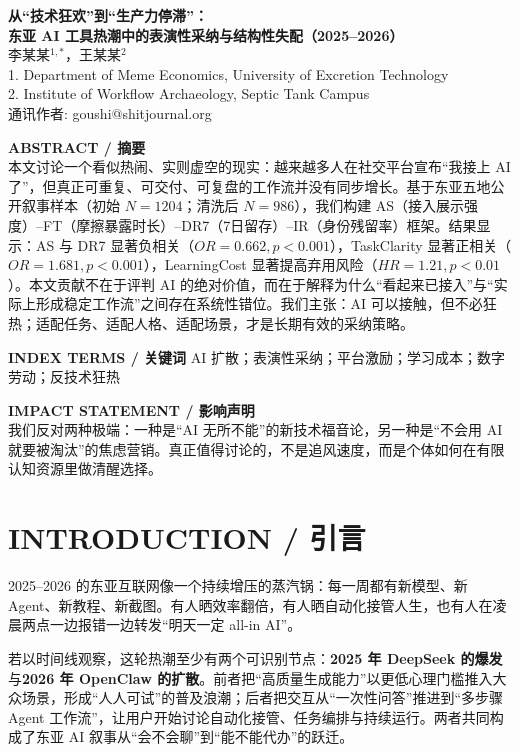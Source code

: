 \documentclass[11pt,a4paper]{ctexart}
\begin{document}
\begin{center}
{\Large\bfseries\color{purple} 从“技术狂欢”到“生产力停滞”：\\
东亚 AI 工具热潮中的表演性采纳与结构性失配（2025--2026）}\\[0.5em]
李某某$^{1,*}$，王某某$^2$\\
\small 1. Department of Meme Economics, University of Excretion Technology\\
\small 2. Institute of Workflow Archaeology, Septic Tank Campus\\
\small *通讯作者: goushi@shitjournal.org
\end{center}

\vspace{0.4em}
\noindent\textbf{ABSTRACT / 摘要}\\
本文讨论一个看似热闹、实则虚空的现实：越来越多人在社交平台宣布“我接上 AI 了”，但真正可重复、可交付、可复盘的工作流并没有同步增长。基于东亚五地公开叙事样本（初始 $N=1204$；清洗后 $N=986$），我们构建 AS（接入展示强度）--FT（摩擦暴露时长）--DR7（7日留存）--IR（身份残留率）框架。结果显示：AS 与 DR7 显著负相关（$OR=0.662, p<0.001$），TaskClarity 显著正相关（$OR=1.681, p<0.001$），LearningCost 显著提高弃用风险（$HR=1.21, p<0.01$）。本文贡献不在于评判 AI 的绝对价值，而在于解释为什么“看起来已接入”与“实际上形成稳定工作流”之间存在系统性错位。我们主张：AI 可以接触，但不必狂热；适配任务、适配人格、适配场景，才是长期有效的采纳策略。

\vspace{0.45em}
\noindent\textbf{INDEX TERMS / 关键词} AI 扩散；表演性采纳；平台激励；学习成本；数字劳动；反技术狂热

\vspace{0.45em}
\noindent\textbf{IMPACT STATEMENT / 影响声明}\\
我们反对两种极端：一种是“AI 无所不能”的新技术福音论，另一种是“不会用 AI 就要被淘汰”的焦虑营销。真正值得讨论的，不是追风速度，而是个体如何在有限认知资源里做清醒选择。

\section{INTRODUCTION / 引言}
2025--2026 的东亚互联网像一个持续增压的蒸汽锅：每一周都有新模型、新 Agent、新教程、新截图。有人晒效率翻倍，有人晒自动化接管人生，也有人在凌晨两点一边报错一边转发“明天一定 all-in AI”。

若以时间线观察，这轮热潮至少有两个可识别节点：\textbf{2025 年 DeepSeek 的爆发}与\textbf{2026 年 OpenClaw 的扩散}。前者把“高质量生成能力”以更低心理门槛推入大众场景，形成“人人可试”的普及浪潮；后者把交互从“一次性问答”推进到“多步骤 Agent 工作流”，让用户开始讨论自动化接管、任务编排与持续运行。两者共同构成了东亚 AI 叙事从“会不会聊”到“能不能代办”的跃迁。
\end{document}
